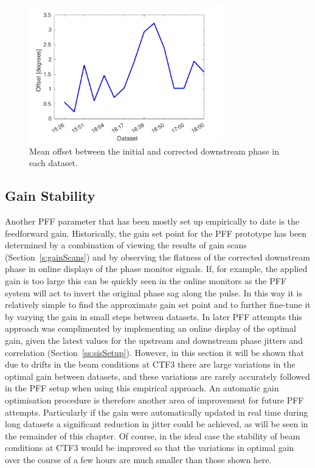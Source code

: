 \begin{figure}
  \centering
  \includegraphics[width=0.75\textwidth]{Figures/feedforward/longFF_phaseOffset}
  \caption{Mean offset between the initial and corrected downstream phase in each dataset.}
  \label{f:longFF_phaseOffset}
\end{figure}


\subsection{Gain Stability}
\label{ss:longFF_gain}

Another PFF parameter that has been mostly set up empirically to date is the feedforward gain. Historically, the gain set point for the PFF prototype has been determined by a combination of viewing the results of gain scans (Section~\ref{s:gainScans}) and by observing the flatness of the corrected downstream phase in online displays of the phase monitor signals. If, for example, the applied gain is too large this can be quickly seen in the online monitors as the PFF system will act to invert the original phase sag along the pulse. In this way it is relatively simple to find the approximate gain set point and to further fine-tune it by varying the gain in small steps between datasets. In later PFF attempts this approach was complimented by implementing an online display of the optimal gain, given the latest values for the upstream and downstream phase jitters and correlation (Section~\ref{ss:sisSetup}). However, in this section it will be shown that due to drifts in the beam conditions at CTF3 there are large variations in the optimal gain between datasets, and these variations are rarely accurately followed in the PFF setup when using this empirical approach. An automatic gain optimisation procedure is therefore another area of improvement for future PFF attempts. Particularly if the gain were automatically updated in real time during long datasets a significant reduction in jitter could be achieved, as will be seen in the remainder of this chapter. Of course, in the ideal case the stability of beam conditions at CTF3 would be improved so that the variations in optimal gain over the course of a few hours are much smaller than those shown here.

